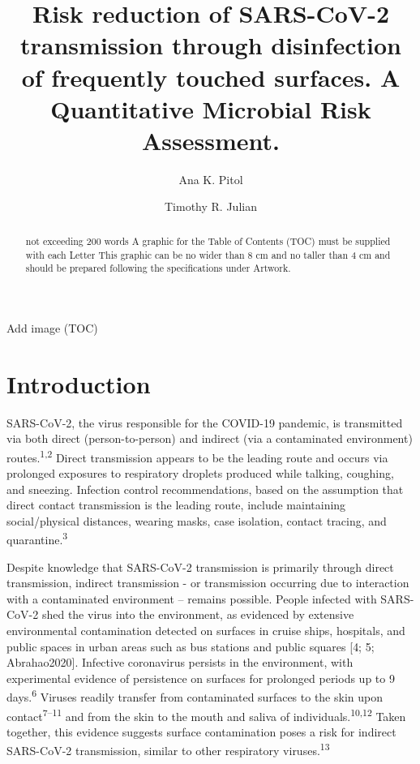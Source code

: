 \documentclass[journal=jacsat,manuscript=article]{achemso}
\author{Ana K. Pitol}
\affiliation{Department of Civil and Environmental Engineering, Imperial College
London, United Kingdom}
\author{Timothy R. Julian}
\affiliation{Department of Environmental Microbiology, Eawag, Dubendorf, Switzerland}
\title[An \textsf{achemso} demo]{Risk reduction of SARS-CoV-2 transmission through disinfection of
frequently touched surfaces. A Quantitative Microbial Risk Assessment.}
\begin{document}
\begin{abstract}
not exceeding 200 words A graphic for the Table of Contents (TOC) must
be supplied with each Letter This graphic can be no wider than 8 cm and
no taller than 4 cm and should be prepared following the specifications
under Artwork.
\end{abstract}
\begin{tocentry}
Add image (TOC)
\end{tocentry}

\hypertarget{introduction}{%
\section{Introduction}\label{introduction}}

SARS-CoV-2, the virus responsible for the COVID-19 pandemic, is
transmitted via both direct (person-to-person) and indirect (via a
contaminated environment) routes.\textsuperscript{1,2} Direct
transmission appears to be the leading route and occurs via prolonged
exposures to respiratory droplets produced while talking, coughing, and
sneezing. Infection control recommendations, based on the assumption
that direct contact transmission is the leading route, include
maintaining social/physical distances, wearing masks, case isolation,
contact tracing, and quarantine.\textsuperscript{3}

Despite knowledge that SARS-CoV-2 transmission is primarily through
direct transmission, indirect transmission - or transmission occurring
due to interaction with a contaminated environment -- remains possible.
People infected with SARS-CoV-2 shed the virus into the environment, as
evidenced by extensive environmental contamination detected on surfaces
in cruise ships, hospitals, and public spaces in urban areas such as bus
stations and public squares {[}4; 5; Abrahao2020{]}. Infective
coronavirus persists in the environment, with experimental evidence of
persistence on surfaces for prolonged periods up to 9
days.\textsuperscript{6} Viruses readily transfer from contaminated
surfaces to the skin upon contact\textsuperscript{7--11} and from the
skin to the mouth and saliva of individuals.\textsuperscript{10,12}
Taken together, this evidence suggests surface contamination poses a
risk for indirect SARS-CoV-2 transmission, similar to other respiratory
viruses.\textsuperscript{13}
\end{document}
